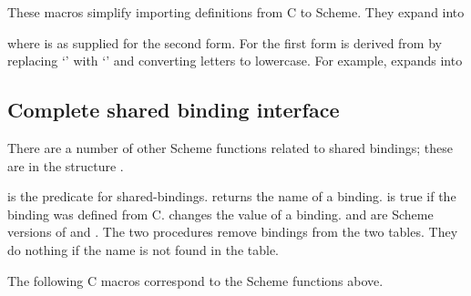 \begin{protos}
\end{protos}
These macros simplify importing definitions from C to Scheme.
They expand into


\noindent{}where  is as supplied for the second form.
For the first form  is derived from  by
 replacing `\code{-}' with `\code{\_}' and converting letters to lowercase.
For example,  expands into


\subsection{Complete shared binding interface}
\label{more-shared-bindings}

There are a number of other Scheme functions related to shared bindings;
 these are in the structure .

\begin{protos}
\end{protos}

\noindent{} is the predicate for shared-bindings.
 returns the name of a binding.
 is true if the binding was defined from C.
 changes the value of a binding.
 and  are
 Scheme versions of 
 and .
The two  procedures remove bindings from the two tables.
They do nothing if the name is not found in the table.

The following C macros correspond to the Scheme functions above.

\begin{protos}
\end{protos}

